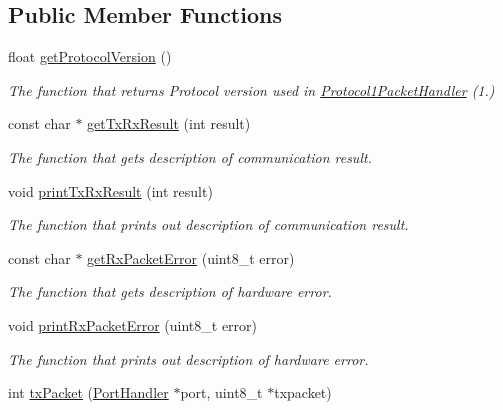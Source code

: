 \subsection*{Public Member Functions}
\begin{DoxyCompactItemize}
\item 
float \hyperlink{classmercury_1_1_protocol1_packet_handler_a311be32dd4a9c44cd3225c7cc9b597be}{get\+Protocol\+Version} ()
\begin{DoxyCompactList}\small\item\em The function that returns Protocol version used in \hyperlink{classmercury_1_1_protocol1_packet_handler}{Protocol1\+Packet\+Handler} (1.) \end{DoxyCompactList}\item 
const char $\ast$ \hyperlink{classmercury_1_1_protocol1_packet_handler_a592143c44ddd734a50be7cd574315343}{get\+Tx\+Rx\+Result} (int result)
\begin{DoxyCompactList}\small\item\em The function that gets description of communication result. \end{DoxyCompactList}\item 
void \hyperlink{classmercury_1_1_protocol1_packet_handler_a5565459c8c12919979e4f3a07d1a5980}{print\+Tx\+Rx\+Result} (int result)
\begin{DoxyCompactList}\small\item\em The function that prints out description of communication result. \end{DoxyCompactList}\item 
const char $\ast$ \hyperlink{classmercury_1_1_protocol1_packet_handler_a33dbffd17503b4a22d417834191cc801}{get\+Rx\+Packet\+Error} (uint8\+\_\+t error)
\begin{DoxyCompactList}\small\item\em The function that gets description of hardware error. \end{DoxyCompactList}\item 
void \hyperlink{classmercury_1_1_protocol1_packet_handler_a1724e55f8a63cdd9fd8bd5df31779d16}{print\+Rx\+Packet\+Error} (uint8\+\_\+t error)
\begin{DoxyCompactList}\small\item\em The function that prints out description of hardware error. \end{DoxyCompactList}\item 
int \hyperlink{classmercury_1_1_protocol1_packet_handler_a232c9159fef54e7aaf38859fcce5a322}{tx\+Packet} (\hyperlink{classmercury_1_1_port_handler}{Port\+Handler} $\ast$port, uint8\+\_\+t $\ast$txpacket)

\end{DoxyCompactItemize}
